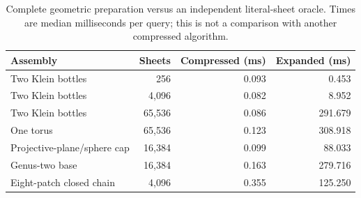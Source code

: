 \begin{table}[!htbp]
\centering\small
\setlength{\tabcolsep}{4pt}
\caption{Complete geometric preparation versus an independent literal-sheet oracle. Times are median milliseconds per query; this is not a comparison with another compressed algorithm.}
\label{tab:geometry}
\begin{tabular}{lrrr}
\toprule
Assembly & Sheets & Compressed (ms) & Expanded (ms)\\
\midrule
Two Klein bottles & 256 & 0.093 & 0.453\\
Two Klein bottles & 4,096 & 0.082 & 8.952\\
Two Klein bottles & 65,536 & 0.086 & 291.679\\
One torus & 65,536 & 0.123 & 308.918\\
Projective-plane/sphere cap & 16,384 & 0.099 & 88.033\\
Genus-two base & 16,384 & 0.163 & 279.716\\
Eight-patch closed chain & 4,096 & 0.355 & 125.250\\
\bottomrule
\end{tabular}
\end{table}
